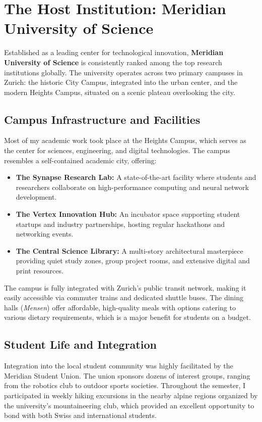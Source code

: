 \section{The Host Institution: Meridian University of Science}
\label{sec:host_university}

Established as a leading center for technological innovation, \textbf{Meridian University of Science} is consistently ranked among the top research institutions globally. The university operates across two primary campuses in Zurich: the historic City Campus, integrated into the urban center, and the modern Heights Campus, situated on a scenic plateau overlooking the city.

\subsection{Campus Infrastructure and Facilities}
Most of my academic work took place at the Heights Campus, which serves as the center for sciences, engineering, and digital technologies. The campus resembles a self-contained academic city, offering:
\begin{itemize}
  \item \textbf{The Synapse Research Lab:} A state-of-the-art facility where students and researchers collaborate on high-performance computing and neural network development.
  \item \textbf{The Vertex Innovation Hub:} An incubator space supporting student startups and industry partnerships, hosting regular hackathons and networking events.
  \item \textbf{The Central Science Library:} A multi-story architectural masterpiece providing quiet study zones, group project rooms, and extensive digital and print resources.
\end{itemize}

The campus is fully integrated with Zurich's public transit network, making it easily accessible via commuter trains and dedicated shuttle buses. The dining halls (\emph{Mensen}) offer affordable, high-quality meals with options catering to various dietary requirements, which is a major benefit for students on a budget.

\subsection{Student Life and Integration}
Integration into the local student community was highly facilitated by the Meridian Student Union. The union sponsors dozens of interest groups, ranging from the robotics club to outdoor sports societies. Throughout the semester, I participated in weekly hiking excursions in the nearby alpine regions organized by the university's mountaineering club, which provided an excellent opportunity to bond with both Swiss and international students.
